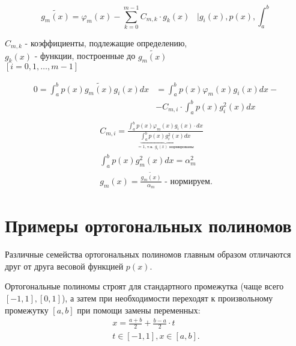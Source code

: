 \documentclass[a4paper,11pt]{article}
\begin{document}
\begin{importantblock}
  \begin{equation*}
    \widetilde{g_m(x)} = \varphi_m(x) - \sum_{k=0}^{m-1}C_{m,k} \cdot g_k(x) \hspace{10pt} \bigg| g_i(x), p(x), \int_a^b
  \end{equation*}
  \begin{flushright}
    \footnotesize
    $C_{m,k}$ - коэффициенты, подлежащие определению, \\
    $g_k(x)$ - функции, построенные до $\widetilde{g_m(x)}$ \\
    $[i=0,1,\dots,m-1]$
  \end{flushright}
  \begin{align*}
    0 =  \int_a^b p(x)\widetilde{g_m(x)}g_i(x)dx &= \int_a^b p(x)\varphi_m(x)g_i(x)dx -\\
    &- C_{m,i} \cdot \int_a^b p(x)g_i^2(x)dx \\
  \end{align*}
  \begin{gather*}
    C_{m,i} = \frac{\int_a^b p(x)\varphi_m(x)g_i(x) \cdot dx}{\underbrace{\int_a^b p(x)g_i^2(x)dx}_{=1\text{, т.к. $g_i(x)$ нормированы}}} \\
    \int_a^b p(x)g_m^2(x)dx = \alpha_m^2 \\
    g_m(x) = \frac{\widetilde{g_m(x)}}{\alpha_m} \textit{ - нормируем}.
  \end{gather*}
\end{importantblock}

\section{Примеры ортогональных полиномов}
Различные семейства ортогональных полиномов главным образом отличаются друг от друга весовой функцией $p(x)$.
\begin{mainblock}
  Ортогональные полиномы строят для стандартного промежутка (чаще всего $[-1, 1], [0, 1]$), а затем при необходимости
  переходят к произвольному промежутку $[a,b]$ при помощи замены переменных:
  \begin{gather*}
    \boxed{x = \frac{a+b}{2}+\frac{b-a}{2} \cdot t} \\
    t \in [-1,1], x \in [a,b].
  \end{gather*}
\end{mainblock}
\end{document}
